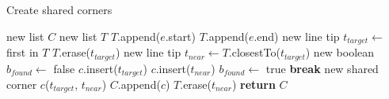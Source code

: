 \begin{algorithm}[!tb]
	\caption{Create shared corners}\label{alg:shared_corners}
\begin{algorithmic}[1]
	\State new list $C$ 
		\State new list $T$ 
			\State $T$.append($e$.start)
			\State $T$.append($e$.end)
		\EndFor
			\State new line tip $t_{target} \leftarrow$ first in $T$
			\State $T$.erase($t_{target}$)
			\State new line tip $t_{near} \leftarrow T$.closestTo($t_{target}$)
			\State new boolean $b_{found} \leftarrow$ false
					\State $c$.insert($t_{target}$)
					\State $c$.insert($t_{near}$)
					\State $b_{found} \leftarrow$ true
					\State \textbf{break}
				\EndIf
			\EndFor
				\State new shared corner $c$($t_{target}$, $t_{near}$)
				\State $C$.append($c$)
			\EndIf
			\State $T$.erase($t_{near}$)
		\EndWhile
	\EndFor
	\State \textbf{return} $C$
\EndFunction
\end{algorithmic}
\end{algorithm}

